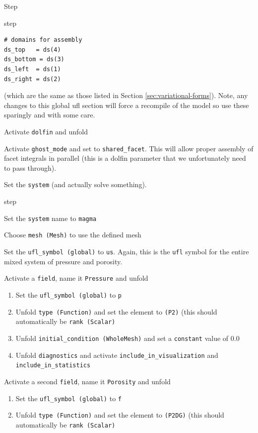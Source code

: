 \begin{steps}{Step}
\begin{steps}{step}
\begin{lstlisting}[style=UFL]
# domains for assembly
ds_top   = ds(4)
ds_bottom = ds(3)
ds_left  = ds(1)
ds_right = ds(2)
    \end{lstlisting}
(which are the same as those listed in Section
\ref{sec:variational-forms}).  Note, any changes to this global ufl
section will force a recompile of the model so use these sparingly and
with some care.  
\item Activate \texttt{dolfin} and unfold
\item Activate \texttt{ghost\_mode} and set to
  \texttt{shared\_facet}.  This will allow proper assembly of facet
  integrals in parallel (this is a dolfin parameter that we
  unfortunately need to pass through).
  \end{steps}
\item Set the \texttt{system} (and actually solve something).
  \begin{steps}{step}
  \item Set the \texttt{system} name to \texttt{magma}
  \item Choose \texttt{mesh (Mesh)} to use the defined mesh
  \item Set the \texttt{ufl\_symbol (global)} to \texttt{us}.  Again,
    this is the \texttt{ufl} symbol for the entire mixed system of
    pressure and porosity.
  \item Activate a \texttt{field}, name it \texttt{Pressure} and unfold
    \begin{enumerate}
    \item Set the \texttt{ufl\_symbol (global)} to \texttt{p}
    \item Unfold \texttt{type (Function)} and set the element to
      \texttt{(P2)} (this should automatically be \texttt{rank
        (Scalar)}
    \item Unfold \texttt{initial\_condition (WholeMesh)} and set a
      \texttt{constant} value of 0.0
    \item Unfold \texttt{diagnostics} and activate
      \texttt{include\_in\_visualization} and \texttt{include\_in\_statistics}
    \end{enumerate}
\item Activate a second \texttt{field}, name it \texttt{Porosity} and unfold
    \begin{enumerate}
    \item Set the \texttt{ufl\_symbol (global)} to \texttt{f}
    \item Unfold \texttt{type (Function)} and set the element to
      \texttt{(P2DG)} (this should automatically be \texttt{rank
        (Scalar)}

\end{enumerate}
\end{steps}
\end{steps}
